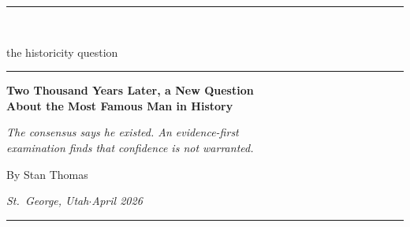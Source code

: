 \documentclass[11pt,oneside]{article}
\begin{document}
\pagestyle{empty}


{\color{rule}\rule{\textwidth}{0.5pt}}\\
\vspace{0.3em}
\begin{center}
{\smallcapsfont\small the historicity question}
\end{center}
\vspace{0.2em}
{\color{rule}\rule{\textwidth}{0.5pt}}

\vspace{1.4em}

\begin{center}
  {\headlinefont\huge\bfseries
   Two Thousand Years Later, a New Question\\[0.15em]
   About the Most Famous Man in History}\par

  \vspace{0.9em}

  {\Large\itshape
   The consensus says he existed.  An evidence-first\\
   examination finds that confidence is not warranted.}\par

  \vspace{1.4em}

  {\smallcapsfont\small By Stan Thomas}\par
  {\small\itshape St.\ George, Utah\quad$\cdot$\quad April 2026}\par

  \vspace{0.4em}
  {\color{rule}\rule{0.4\textwidth}{0.4pt}}
\end{center}

\vspace{1.2em}

\end{document}

